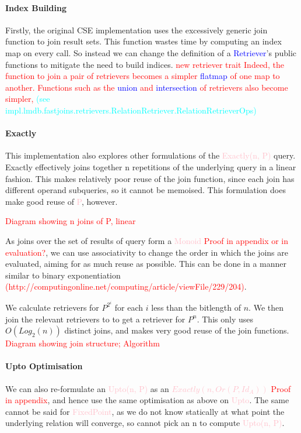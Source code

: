 \documentclass[12pt,a4paper,twoside,openright]{report}
\newcommand\todo[1]{\textcolor{red}{#1}}
\newcommand\codeName[1]{\textcolor{blue}{#1}}
\newcommand\note[1]{\textcolor{cyan}{#1}}
\newcommand\mathName[1]{\textcolor{pink}{#1}}
\begin{document}
		\paragraph{Index Building}
			Firstly, the original CSE implementation uses the excessively generic join function to join result sets. This function wastes time by computing an index map on every call. So instead we can change the definition of a \codeName{Retriever}'s public functions to mitigate the need to build indices.
			\todo{new retriever trait
			Indeed, the function to join a pair of retrievers becomes a simpler \codeName{flatmap} of one map to another. Functions such as the \codeName{union} and \codeName{intersection} of retrievers also become simpler, \note{(see impl.lmdb.fastjoins.retrievers.RelationRetriever.RelationRetrieverOps)}
}
		\paragraph{Exactly}
		This implementation also explores other formulations of the \mathName{Exactly(n, P)} query. Exactly effectively joins together n repetitions of the underlying query in a linear fashion. This makes relatively poor reuse of the join function, since each join has different operand subqueries, so it cannot be memoised. This formulation does make good reuse of \mathName{P}, however.
		
		\todo{Diagram showing n joins of P, linear}
		
		
		As joins over the set of results of query form a \mathName{Monoid} \todo{Proof in appendix or in evaluation?}, we can use associativity to change the order in which the joins are evaluated, aiming for as much reuse as possible. This can be done in a manner similar to binary exponentiation \todo{(http://computingonline.net/computing/article/viewFile/229/204)}.

We calculate retrievers for $P^{2^i}$ for each $i$ less than the bitlength of $n$. We then join the relevant retrievers to to get a retriever for $P^n$. This only uses $O(Log_2(n))$ distinct joins, and makes very good reuse of the join functions. \todo{Diagram showing join structure;} \todo{Algorithm}

		\paragraph{Upto Optimisation}
			We can also re-formulate an \mathName{Upto(n, P)} as an \mathName{$Exactly(n, Or(P, Id_A))$} \todo{Proof in appendix}, and hence use the same optimisation as above on \mathName{Upto}.  The same cannot be said for \mathName{FixedPoint}, as we do not know statically at what point the underlying relation will converge, so cannot pick an n to compute \mathName{Upto(n, P)}.
\end{document}
